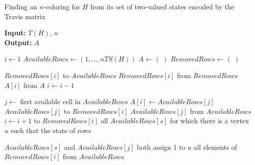 \documentclass[%
12pt,
prereprint,
showpacs,
showkeys,
preprintnumbers,
amsmath,amssymb,
aps,
pra,
longbibliography,
notitlepage
]{revtex4-1}
\theoremstyle{definition}
\begin{document}
        \def\NoNumber#1{{\def\alglinenumber##1{}\State #1}\addtocounter{ALG@line}{-1}}

        \begin{algorithm}
                \caption{Finding an $n$-coloring for $H$  from its set of two-valued states encoded by the Travis matrix}\label{algorithm1}
                \begin{flushleft} $\;$\\ \hspace*{\algorithmicindent}
                    \textbf{Input:} $T(H)$, $n$ \\
                        \hspace*{\algorithmicindent} \textbf{Output:} $A$ 
                \end{flushleft}
                \begin{algorithmic}[1]

                        \State $i\gets 1$ 
                        \State $AvailableRows\gets (1,\ldots,nTS(H))$
                        \State $A\gets (\;)$
                        \State $RemovedRows\gets (\;)$ 
                        \NoNumber{ }
                         

                         

                         $RemovedRows[i]$ to $AvailableRows$
                         $RemovedRows[i]$ from $RemovedRows$
                         $A[i]$ from $A$
                        \State $i\gets i-1$

                        \Else {}

                        \State $j\gets$ first available cell in $AvailableRows$
                        \State $A[i] \gets AvailableRows[j]$
                         $AvailableRows[j]$ to $RemovedRows[i]$
                         $AvailableRows[j]$ from $AvailableRows$
                        \State $i\gets i+1$
                         to $RemovedRows[i]$ all $AvailableRows[s]$  for which there is a vertex $u$
                        \NoNumber{\hspace{1.2 cm}such that the state of rows}
                        $AvailableRows[s]$ and $AvailableRows[j]$ both assign 1 to $u$
                         all elements of $RemovedRows[i]$ from $AvailableRows$
                        \EndIf

                        \EndWhile
                \end{algorithmic}
        \end{algorithm}
\end{document}
